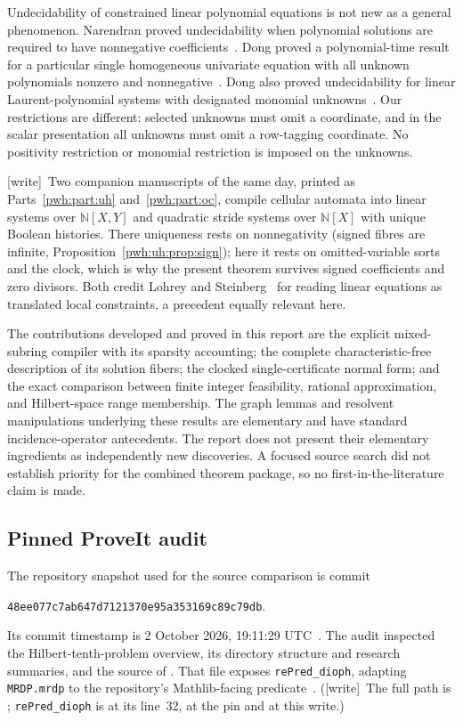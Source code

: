 \documentclass[11pt,letterpaper]{article}
\numberwithin{equation}{section}
\theoremstyle{definition}
\newcommand{\N}{\mathbb N}
\newcommand{\wtag}{\textup{[write]}}
\begin{document}
Undecidability of constrained linear polynomial equations is not new as
a general phenomenon. Narendran proved undecidability when polynomial
solutions are required to have nonnegative coefficients~\cite{bt:narendran}.
Dong proved a polynomial-time result for a particular single homogeneous
univariate equation with all unknown polynomials nonzero and
nonnegative~\cite{bt:dong2023}. Dong also proved undecidability for linear
Laurent-polynomial systems with designated monomial unknowns~\cite{bt:dong2025}.
Our restrictions are different: selected unknowns must omit a coordinate,
and in the scalar presentation all unknowns must omit a row-tagging
coordinate. No positivity restriction or monomial restriction is imposed
on the unknowns.

\wtag\ Two companion manuscripts of the same day, printed as
Parts~\ref{pwh:part:uh} and~\ref{pwh:part:oc}, compile cellular automata
into linear systems over $\N[X,Y]$ and quadratic stride systems over
$\N[X]$ with unique Boolean histories. There uniqueness rests on
nonnegativity (signed fibres are infinite,
Proposition~\ref{pwh:uh:prop:sign}); here it rests on omitted-variable
sorts and the clock, which is why the present theorem survives signed
coefficients and zero divisors. Both credit Lohrey and
Steinberg~\cite{uh:LohreySteinberg} for reading linear equations as
translated local constraints, a precedent equally relevant here.

The contributions developed and proved in this report are the explicit
mixed-subring compiler with its sparsity accounting; the complete
characteristic-free description of its solution fibers; the clocked
single-certificate normal form; and the exact comparison between finite
integer feasibility, rational approximation, and Hilbert-space range
membership. The graph lemmas and resolvent manipulations underlying these
results are elementary and have standard incidence-operator antecedents.
The report does not present their elementary ingredients as independently
new discoveries. A focused source search did not establish priority for
the combined theorem package, so no first-in-the-literature claim is made.

\subsection{Pinned ProveIt audit}
The repository snapshot used for the source comparison is commit
\begin{center}
\texttt{48ee077c7ab647d7121370e95a353169c89c79db}.
\end{center}
Its commit timestamp is 2 October 2026, 19:11:29 UTC~\cite{bt:repo}.
The audit inspected the Hilbert-tenth-problem overview, its directory
structure and research summaries, and the source of
. That file exposes
\texttt{rePred\_dioph}, adapting \texttt{MRDP.mrdp} to the repository's
Mathlib-facing predicate~\cite{bt:repo-bridge}.
(\wtag\ The full path is
;
\texttt{rePred\_dioph} is at its line~32, at the pin and at this write.)
\end{document}
